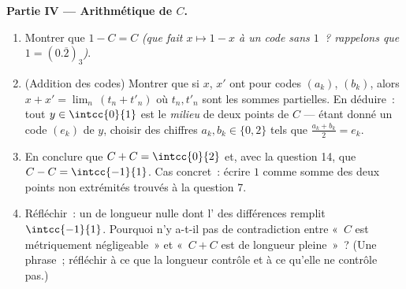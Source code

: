 \begin{problem}[{Devoir maison --- l'\omterm{def:b1:logic:sets}{ensemble} triadique de Cantor~:
longueur nulle, non dénombrable, parfait, et $C + C =
\intcc{0}{2}$}]
\medskip
\noindent\textbf{Partie IV --- Arithmétique de $C$.}
\begin{enumerate}[resume]
  \item Montrer que $1 - C = C$ \emph{(que fait $x \mapsto 1 - x$
        à un code sans $1$~? rappelons que $1 = (0.\overline{2})_3$)}.
  \item (Addition des codes) Montrer que si $x$, $x'$ ont pour
        codes $(a_k)$, $(b_k)$, alors $x + x' = \lim_n\,(t_n + t'_n)$
        où $t_n, t'_n$ sont les sommes partielles. En déduire~:
        tout $y \in \intcc{0}{1}$ est le \emph{milieu} de deux
        points de $C$ --- étant donné un code $(e_k)$ de $y$,
        choisir des chiffres $a_k, b_k \in \{0, 2\}$ tels que
        $\frac{a_k + b_k}{2} = e_k$.
  \item En conclure que $C + C = \intcc{0}{2}$ et, avec la
        question 14, que $C - C = \intcc{-1}{1}$. Cas concret~:
        écrire $1$ comme somme des deux points non extrémités
        trouvés à la question 7.
  \item Réfléchir~: un  de longueur nulle dont l'
        des différences remplit $\intcc{-1}{1}$. Pourquoi n'y
        a-t-il pas de contradiction entre «~$C$ est métriquement
        négligeable~» et «~$C + C$ est de longueur pleine~»~? (Une
        phrase~; réfléchir à ce que la longueur contrôle et à ce
        qu'elle ne contrôle pas.)
\end{enumerate}


\end{problem}
